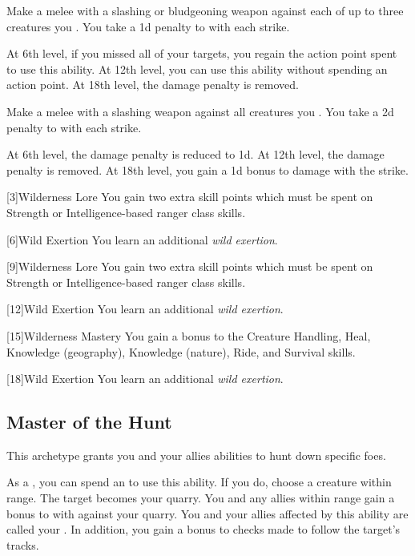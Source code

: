 {             Make a melee  with a slashing or bludgeoning weapon against each of up to three creatures you .
            You take a \minus1d penalty to  with each strike.
            \par At 6th level, if you missed all of your targets, you regain the action point spent to use this ability.
            At 12th level, you can use this ability without spending an action point.
            At 18th level, the damage penalty is removed.

             Make a melee  with a slashing weapon against all creatures you .
            You take a \minus2d penalty to  with each strike.
            \par At 6th level, the damage penalty is reduced to \minus1d.
            At 12th level, the damage penalty is removed.
            At 18th level, you gain a \plus1d bonus to damage with the strike.
        }

        [3]{Wilderness Lore} You gain two extra skill points which must be spent on Strength or Intelligence-based ranger class skills.

        [6]{Wild Exertion}
        You learn an additional \textit{wild exertion}.

        [9]{Wilderness Lore} You gain two extra skill points which must be spent on Strength or Intelligence-based ranger class skills.

        [12]{Wild Exertion} 
        You learn an additional \textit{wild exertion}.

        [15]{Wilderness Mastery} You gain a  bonus to the Creature Handling, Heal, Knowledge (geography), Knowledge (nature), Ride, and Survival skills.

        [18]{Wild Exertion} 
        You learn an additional \textit{wild exertion}.

    \subsection{Master of the Hunt}
        This archetype grants you and your allies abilities to hunt down specific foes.

        \label{Quarry}
        As a , you can spend an  to use this ability.
        If you do, choose a creature within \rnglong range.
        The target becomes your quarry.
        You and any allies within range gain a  bonus to  with  against your quarry.
        You and your allies affected by this ability are called your .
        In addition, you gain a  bonus to checks made to follow the target's tracks.


